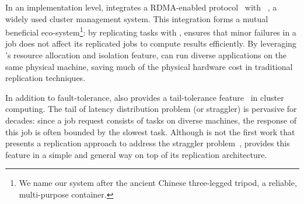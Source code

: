 
In an implementation level, \xxx integrates a RDMA-enabled \paxos 
protocol~\cite{falcon:github} with \mesos~\cite{mesos:nsdi11}, a widely used 
cluster management system. This integration forms a mutual beneficial 
eco-system\footnote{We name 
our system after the ancient Chinese three-legged tripod, a reliable, 
multi-purpose container.}: by replicating tasks with \paxos, \xxx ensures that 
minor failures in a job does not affect its replicated jobs to compute 
results efficiently. By leveraging \mesos's resource allocation and isolation 
feature, \xxx can run diverse applications on the same physical machine, saving 
much of the physical hardware cost in traditional replication techniques.




In addition to fault-tolerance, \xxx also provides a tail-tolerance 
feature~\cite{tail:cacm13} in cluster computing. The tail of latency 
distribution problem (or straggler) is pervasive for decades: since a 
job request consists of tasks on diverse machines, the response of this 
job is often bounded by the slowest task. Although \xxx is not the first work 
that presents a replication approach to address the straggler 
problem~\cite{dolly:nsdi13}, \xxx provides this feature in a simple and general 
way on top of its \paxos replication architecture.


